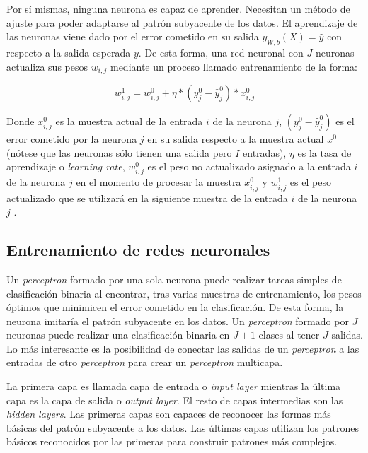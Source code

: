 Por sí mismas, ninguna neurona es capaz de aprender. Necesitan un método de ajuste para poder adaptarse al patrón subyacente de los datos. El aprendizaje de las neuronas viene dado por el error cometido en su salida $y_{W,b}(X)=\hat{y}$ con respecto a la salida esperada $y$. De esta forma, una red neuronal con $J$ neuronas actualiza sus pesos $w_{i,j}$ mediante un proceso llamado entrenamiento de la forma:

\begin{equation*}
w_{i,j}^{1} = w_{i,j}^0 + \eta *(y_j^0 - \hat{y}_j^0)*x_{i,j}^0
\end{equation*}

Donde $x_{i,j}^0$ es la muestra actual de la entrada $i$ de la neurona $j$, $(y_j^0 - \hat{y}_j^0)$ es el error cometido por la neurona $j$ en su salida respecto a la muestra actual $x^0$ (nótese que las neuronas sólo tienen una salida pero $I$ entradas), $\eta$ es la tasa de aprendizaje o \textit{learning rate}, $w_{i,j}^0$ es el peso no actualizado asignado a la entrada $i$ de la neurona $j$ en el momento de procesar la muestra $x_{i,j}^0$ y $w_{i,j}^{1}$ es el peso actualizado que se utilizará en la siguiente muestra de la entrada $i$ de la neurona $j$ \cite{machinelearningbook}.

\subsection{Entrenamiento de redes neuronales}
Un \textit{perceptron} formado por una sola neurona puede realizar tareas simples de clasificación binaria al encontrar, tras varias muestras de entrenamiento, los pesos óptimos que minimicen el error cometido en la clasificación. De esta forma, la neurona imitaría el patrón subyacente en los datos. Un \textit{perceptron} formado por $J$ neuronas puede realizar una clasificación binaria en $J+1$ clases al tener $J$ salidas. Lo más interesante es la posibilidad de conectar las salidas de un \textit{perceptron} a las entradas de otro \textit{perceptron} para crear un \textit{perceptron} multicapa.

La primera capa es llamada capa de entrada o \textit{input layer} mientras la última capa es la capa de salida o \textit{output layer}. El resto de capas intermedias son las \textit{hidden layers}. Las primeras capas son capaces de reconocer las formas más básicas del patrón subyacente a los datos. Las últimas capas utilizan los patrones básicos reconocidos por las primeras para construir patrones más complejos.

